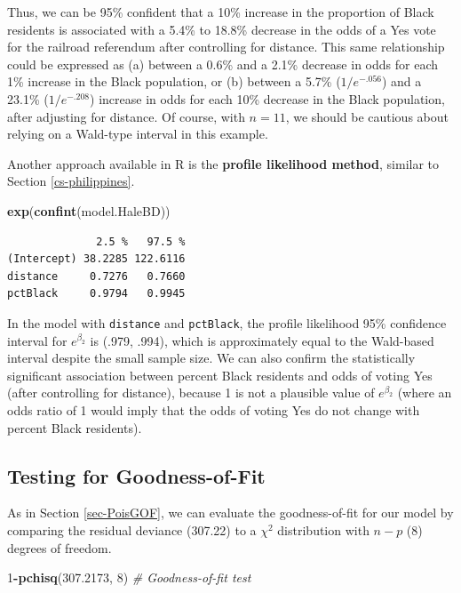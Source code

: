 \documentclass[
]{krantz}
\newenvironment{Shaded}{\begin{snugshade}}{\end{snugshade}}
\newcommand{\CommentTok}[1]{\textcolor[rgb]{0.37,0.37,0.37}{\textit{#1}}}
\newcommand{\DecValTok}[1]{\textcolor[rgb]{0.06,0.06,0.06}{#1}}
\newcommand{\FloatTok}[1]{\textcolor[rgb]{0.06,0.06,0.06}{#1}}
\newcommand{\FunctionTok}[1]{\textcolor[rgb]{0.27,0.27,0.27}{\textbf{#1}}}
\newcommand{\NormalTok}[1]{#1}
\newcommand{\SpecialCharTok}[1]{\textcolor[rgb]{0.43,0.43,0.43}{\textbf{#1}}}
\begin{document}
Thus, we can be 95\% confident that a 10\% increase in the proportion of Black residents is associated with a 5.4\% to 18.8\% decrease in the odds of a Yes vote for the railroad referendum after controlling for distance. This same relationship could be expressed as (a) between a 0.6\% and a 2.1\% decrease in odds for each 1\% increase in the Black population, or (b) between a 5.7\% (\(1/e^{-.056}\)) and a 23.1\% (\(1/e^{-.208}\)) increase in odds for each 10\% decrease in the Black population, after adjusting for distance. Of course, with \(n=11\), we should be cautious about relying on a Wald-type interval in this example.

Another approach available in R is the \textbf{profile likelihood method},  similar to Section \ref{cs-philippines}.

\begin{Shaded}
\begin{Highlighting}[]
\FunctionTok{exp}\NormalTok{(}\FunctionTok{confint}\NormalTok{(model.HaleBD))}
\end{Highlighting}
\end{Shaded}

\begin{verbatim}
              2.5 %   97.5 %
(Intercept) 38.2285 122.6116
distance     0.7276   0.7660
pctBlack     0.9794   0.9945
\end{verbatim}

In the model with \texttt{distance} and \texttt{pctBlack}, the profile likelihood 95\% confidence interval for \(e^{\beta_2}\) is (.979, .994), which is approximately equal to the Wald-based interval despite the small sample size. We can also confirm the statistically significant association between percent Black residents and odds of voting Yes (after controlling for distance), because 1 is not a plausible value of \(e^{\beta_2}\) (where an odds ratio of 1 would imply that the odds of voting Yes do not change with percent Black residents).

\subsection{Testing for Goodness-of-Fit}\label{testing-for-goodness-of-fit}

As in Section \ref{sec-PoisGOF}, we can evaluate the goodness-of-fit for our model by comparing the residual deviance (307.22) to a \(\chi^2\) distribution with \(n-p\) (8) degrees of freedom.

\begin{Shaded}
\begin{Highlighting}[]
\DecValTok{1}\SpecialCharTok{{-}}\FunctionTok{pchisq}\NormalTok{(}\FloatTok{307.2173}\NormalTok{, }\DecValTok{8}\NormalTok{)  }\CommentTok{\# Goodness{-}of{-}fit test}
\end{Highlighting}
\end{Shaded}
\end{document}
